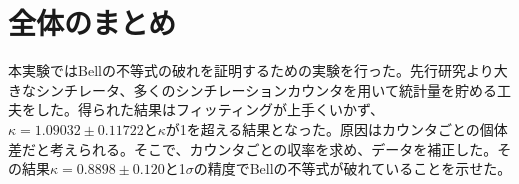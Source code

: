 \documentclass[../../main.tex]{subfiles}
\numberwithin{equation}{section}
\numberwithin{table}{section}
\numberwithin{figure}{section}
\begin{document}
	\FloatBarrier
	\section{全体のまとめ}
	本実験ではBellの不等式の破れを証明するための実験を行った。先行研究より大きなシンチレータ、多くのシンチレーションカウンタを用いて統計量を貯める工夫をした。得られた結果はフィッティングが上手くいかず、$\kappa=1.09032\pm 0.11722$と$\kappa$が1を超える結果となった。原因はカウンタごとの個体差だと考えられる。そこで、カウンタごとの収率を求め、データを補正した。その結果$\kappa=0.8898\pm 0.120$と1$\sigma$の精度でBellの不等式が破れていることを示せた。
\end{document}
